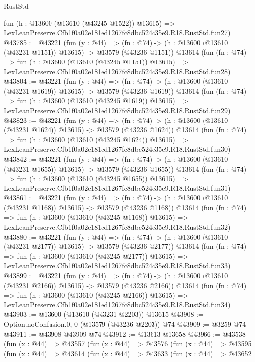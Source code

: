 \begin{lexlean}{RustStd}
\begin{coremodule}
    fun (h : @13600 (@13610 (@43245 @1522)) @13615) =>
    LexLeanPreserve.Cfb1f0a02e181ed1267fc8dbc524c35e9.R18.RustStd.fun27)
@43785 := @43221
    (fun (y : @44) =>
    (fn : @74) -> (h : @13600 (@13610 (@43231 @1151)) @13615) -> @13579 (@43236 @1151))
    @13614
    (fun (fn : @74) =>
    fun (h : @13600 (@13610 (@43245 @1151)) @13615) =>
    LexLeanPreserve.Cfb1f0a02e181ed1267fc8dbc524c35e9.R18.RustStd.fun28)
@43804 := @43221
    (fun (y : @44) =>
    (fn : @74) -> (h : @13600 (@13610 (@43231 @1619)) @13615) -> @13579 (@43236 @1619))
    @13614
    (fun (fn : @74) =>
    fun (h : @13600 (@13610 (@43245 @1619)) @13615) =>
    LexLeanPreserve.Cfb1f0a02e181ed1267fc8dbc524c35e9.R18.RustStd.fun29)
@43823 := @43221
    (fun (y : @44) =>
    (fn : @74) -> (h : @13600 (@13610 (@43231 @1624)) @13615) -> @13579 (@43236 @1624))
    @13614
    (fun (fn : @74) =>
    fun (h : @13600 (@13610 (@43245 @1624)) @13615) =>
    LexLeanPreserve.Cfb1f0a02e181ed1267fc8dbc524c35e9.R18.RustStd.fun30)
@43842 := @43221
    (fun (y : @44) =>
    (fn : @74) -> (h : @13600 (@13610 (@43231 @1655)) @13615) -> @13579 (@43236 @1655))
    @13614
    (fun (fn : @74) =>
    fun (h : @13600 (@13610 (@43245 @1655)) @13615) =>
    LexLeanPreserve.Cfb1f0a02e181ed1267fc8dbc524c35e9.R18.RustStd.fun31)
@43861 := @43221
    (fun (y : @44) =>
    (fn : @74) -> (h : @13600 (@13610 (@43231 @1168)) @13615) -> @13579 (@43236 @1168))
    @13614
    (fun (fn : @74) =>
    fun (h : @13600 (@13610 (@43245 @1168)) @13615) =>
    LexLeanPreserve.Cfb1f0a02e181ed1267fc8dbc524c35e9.R18.RustStd.fun32)
@43880 := @43221
    (fun (y : @44) =>
    (fn : @74) -> (h : @13600 (@13610 (@43231 @2177)) @13615) -> @13579 (@43236 @2177))
    @13614
    (fun (fn : @74) =>
    fun (h : @13600 (@13610 (@43245 @2177)) @13615) =>
    LexLeanPreserve.Cfb1f0a02e181ed1267fc8dbc524c35e9.R18.RustStd.fun33)
@43899 := @43221
    (fun (y : @44) =>
    (fn : @74) -> (h : @13600 (@13610 (@43231 @2166)) @13615) -> @13579 (@43236 @2166))
    @13614
    (fun (fn : @74) =>
    fun (h : @13600 (@13610 (@43245 @2166)) @13615) =>
    LexLeanPreserve.Cfb1f0a02e181ed1267fc8dbc524c35e9.R18.RustStd.fun34)
@43903 := @13600 (@13610 (@43231 @2203)) @13615
@43908 := Option.noConfusion.{0, 0} (@13579 (@43236 @2203)) @74
@43909 := @3259 @74
@43911 := @43908 @43909 @74
@43912 := @13613 @13658
@43966 := @43538
    (fun (x : @44) =>
    @43557
      (fun (x : @44) =>
      @43576
        (fun (x : @44) =>
        @43595
          (fun (x : @44) =>
          @43614
            (fun (x : @44) =>
            @43633
              (fun (x : @44) =>
              @43652

\end{coremodule}
\end{lexlean}
